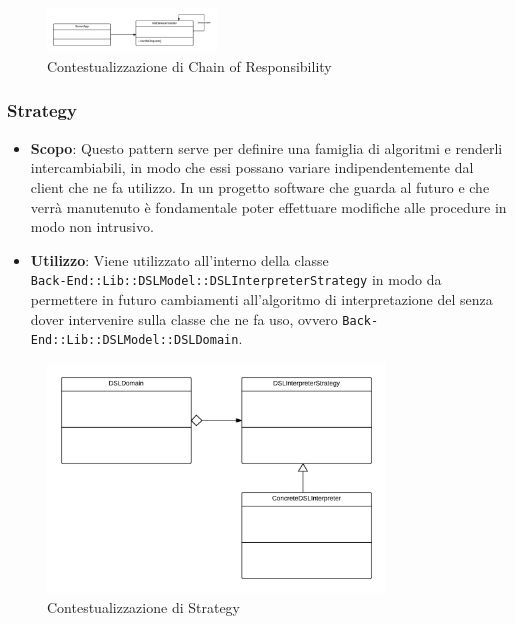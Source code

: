 \begin{figure}[H]
\centering \includegraphics[width=0.4\textwidth]{patterns/contestualizzazione/chain-of-responsability.png}
\caption{Contestualizzazione di Chain of Responsibility}
\label{fig:mvc}
\end{figure}

\subsubsection{Strategy}

\begin{itemize}

	\item \textbf{Scopo}: Questo pattern serve per definire una famiglia di algoritmi e renderli intercambiabili, in modo che essi possano variare indipendentemente dal client che ne fa utilizzo. In un progetto software che guarda al futuro e che verrà manutenuto è fondamentale poter effettuare modifiche alle procedure in modo non intrusivo.
	\item \textbf{Utilizzo}: Viene utilizzato all'interno della classe \\ \texttt{Back-End::Lib::DSLModel::DSLInterpreterStrategy} in modo da permettere in futuro cambiamenti all'algoritmo di interpretazione del  senza dover intervenire sulla classe che ne fa uso, ovvero \texttt{Back-End::Lib::DSLModel::DSLDomain}.

\end{itemize}

\begin{figure}[H]
\centering \includegraphics[width=0.8\textwidth]{patterns/contestualizzazione/strategy.png}
\caption{Contestualizzazione di Strategy}
\label{fig:mvc}
\end{figure}


